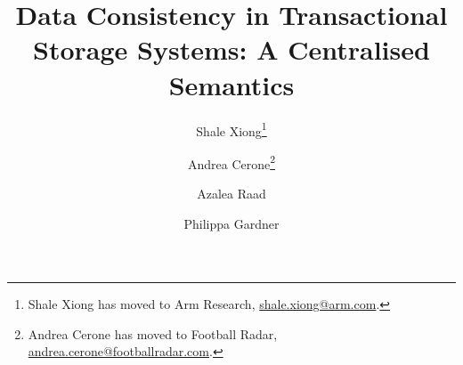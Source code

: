 \documentclass[a4paper,UKenglish,cleveref,autoref,thm-restate]{lipics-v2019}
\title{Data Consistency in Transactional Storage Systems: A Centralised Semantics}
\author{Shale Xiong\footnote{Shale Xiong has moved to Arm Research, \url{shale.xiong@arm.com}.}}
       {Department of Computing, Imperial College London, UK}{shale.xiong14@ic.ac.uk}
       {}
       {The Department of Computing, Imperial College London, and EPSRC Fellowship VeTSpec: Verified Trustworthy Software Specification (EP/R034567/1)}
\author{Andrea Cerone\footnote{Andrea Cerone has moved to Football Radar, \url{andrea.cerone@footballradar.com}.}}
       {Department of Computing, Imperial College London, UK}
       {andrea.cerone@fic.ac.uk}
       {}
       {EPSRC Programme Grant REMS: Rigorous Engineering for Mainstream Systems (EP/K008528/1), and EPSRC Fellowship VeTSpec: Verified Trustworthy Software Specification (EP/R034567/1)}
\author{Azalea Raad}
       {MPI-SWS, Germany}
       {azalea@mpi-sws.org}
       {}
       {ERC Horizon 2020 Consolidator Grant `RustBelt' (grant agreement no.\ 683289)}
\author{Philippa Gardner}
       {Department of Computing, Imperial College London, UK}
       {p.gardner@ic.ac.uk}
       {}
       {EPSRC Programme Grant REMS: Rigorous Engineering for Mainstream Systems (EP/K008528/1), and EPSRC Fellowship VeTSpec: Verified Trustworthy Software Specification (EP/R034567/1)}
\newcommand{\RootPath}{.}
\begin{document}
\maketitle

\begin{abstract}

\end{abstract}








\end{document}
